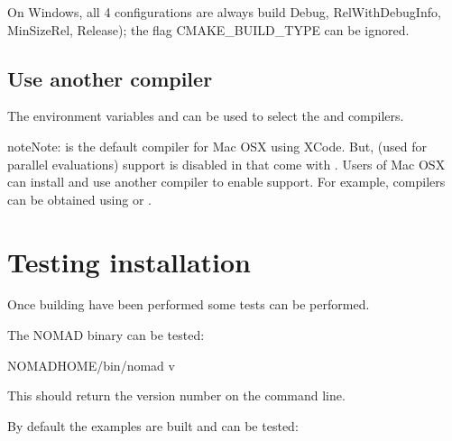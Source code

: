 \documentclass[letterpaper,10pt,english]{sphinxmanual}
\begin{document}
\sphinxAtStartPar
On Windows, all 4 configurations are always build Debug, RelWithDebugInfo, MinSizeRel, Release); the flag CMAKE\_BUILD\_TYPE can be ignored.


\section{Use another compiler}
\label{\detokenize{Installation:use-another-compiler}}
\sphinxAtStartPar
The environment variables  and  can be used to select the  and  compilers.

\begin{sphinxadmonition}{note}{Note:}
\sphinxAtStartPar
{} is the default compiler for Mac OSX using XCode. But,  (used for parallel evaluations)
support is disabled in  that come with .
Users of Mac OSX can install and use another compiler to enable  support.
For example,  compilers can be obtained using  or .
\end{sphinxadmonition}


\chapter{Testing installation}
\label{\detokenize{Installation:testing-installation}}
\sphinxAtStartPar
Once building  have been performed some tests can be performed.

\sphinxAtStartPar
The NOMAD binary can be tested:

\begin{sphinxVerbatim}[commandchars=\\\{\}]
\PYGZdl{}NOMAD\PYGZus{}HOME/bin/nomad \PYGZhy{}v
\end{sphinxVerbatim}

\sphinxAtStartPar
This should return the version number on the command line.

\sphinxAtStartPar
By default the examples are built and can be tested:

\begin{sphinxVerbatim}[commandchars=\\\{\}]
 
\end{sphinxVerbatim}
\end{document}

